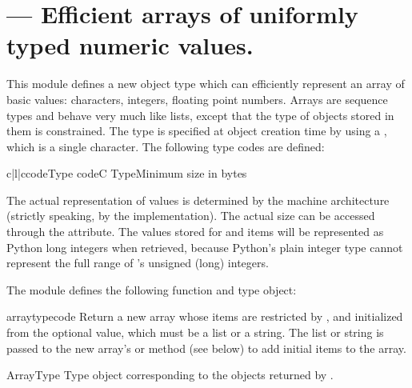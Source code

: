 \section{ ---
         Efficient arrays of uniformly typed numeric values.}



This module defines a new object type which can efficiently represent
an array of basic values: characters, integers, floating point
numbers.  Arrays are sequence types and behave very much like lists,
except that the type of objects stored in them is constrained.  The
type is specified at object creation time by using a ,
which is a single character.  The following type codes are defined:

\begin{tableiii}{c|l|c}{code}{Type code}{C Type}{Minimum size in bytes}
\end{tableiii}

The actual representation of values is determined by the machine
architecture (strictly speaking, by the \C{} implementation).  The actual
size can be accessed through the  attribute.  The values
stored  for  and  items will be represented as
Python long integers when retrieved, because Python's plain integer
type cannot represent the full range of \C{}'s unsigned (long) integers.


The module defines the following function and type object:

\begin{funcdesc}{array}{typecode}
Return a new array whose items are restricted by , and
initialized from the optional  value, which must be a
list or a string.  The list or string is passed to the new array's
 or  method (see below) to add
initial items to the array.
\end{funcdesc}

\begin{datadesc}{ArrayType}
Type object corresponding to the objects returned by
.
\end{datadesc}


